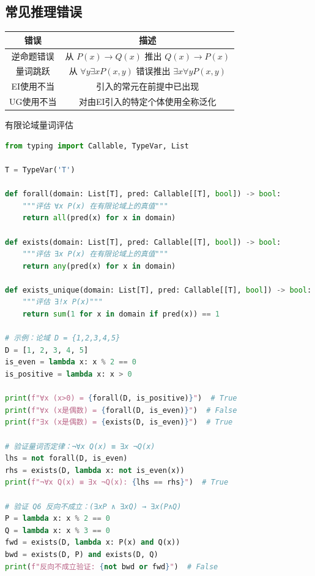 \subsection{常见推理错误}

\begin{center}
\begin{tabular}{c|c}
\toprule
错误 & 描述 \\
\midrule
逆命题错误 & 从 $P(x) \rightarrow Q(x)$ 推出 $Q(x) \rightarrow P(x)$ \\
量词跳跃 & 从 $\forall y \exists x P(x,y)$ 错误推出 $\exists x \forall y P(x,y)$ \\
EI使用不当 & 引入的常元在前提中已出现 \\
UG使用不当 & 对由EI引入的特定个体使用全称泛化 \\
\bottomrule
\end{tabular}
\end{center}

\begin{mycode}{有限论域量词评估}
\begin{lstlisting}[language=Python]
from typing import Callable, TypeVar, List

T = TypeVar('T')

def forall(domain: List[T], pred: Callable[[T], bool]) -> bool:
    """评估 ∀x P(x) 在有限论域上的真值"""
    return all(pred(x) for x in domain)

def exists(domain: List[T], pred: Callable[[T], bool]) -> bool:
    """评估 ∃x P(x) 在有限论域上的真值"""
    return any(pred(x) for x in domain)

def exists_unique(domain: List[T], pred: Callable[[T], bool]) -> bool:
    """评估 ∃!x P(x)"""
    return sum(1 for x in domain if pred(x)) == 1

# 示例：论域 D = {1,2,3,4,5}
D = [1, 2, 3, 4, 5]
is_even = lambda x: x % 2 == 0
is_positive = lambda x: x > 0

print(f"∀x (x>0) = {forall(D, is_positive)}")  # True
print(f"∀x (x是偶数) = {forall(D, is_even)}")  # False
print(f"∃x (x是偶数) = {exists(D, is_even)}")  # True

# 验证量词否定律：¬∀x Q(x) ≡ ∃x ¬Q(x)
lhs = not forall(D, is_even)
rhs = exists(D, lambda x: not is_even(x))
print(f"¬∀x Q(x) ≡ ∃x ¬Q(x): {lhs == rhs}")  # True

# 验证 Q6 反向不成立：(∃xP ∧ ∃xQ) → ∃x(P∧Q)
P = lambda x: x % 2 == 0
Q = lambda x: x % 3 == 0
fwd = exists(D, lambda x: P(x) and Q(x))
bwd = exists(D, P) and exists(D, Q)
print(f"反向不成立验证: {not bwd or fwd}")  # False
\end{lstlisting}
\end{mycode}
